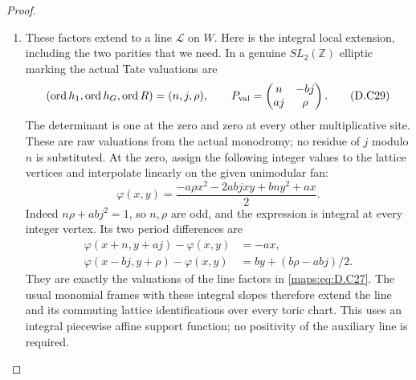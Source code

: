 \begin{proof}
\begin{enumerate}[label=\arabic*.,leftmargin=*]
\item These factors extend to a line $\mathcal L$ on $W$. Here is the
integral local extension, including the two parities that we need.
In a genuine $SL_2(\mathbb Z)$ elliptic marking the actual Tate
valuations are
\[
 (\operatorname{ord}h_1,\operatorname{ord}h_G,
       \operatorname{ord}R)=(n,j,\rho),\qquad
 P_{\rm val}=\begin{pmatrix}n&-bj\\aj&\rho\end{pmatrix}.
                                                               \tag{D.C29}\label{maps:eq:D.C29}
\]
The determinant is one at the zero and zero at every other
multiplicative site. These are raw valuations from the actual
monodromy; no residue of $j$ modulo $n$ is substituted.
At the zero, assign the following integer values to the lattice
vertices and interpolate linearly on the given unimodular fan:
\[
 \varphi(x,y)=
 \frac{-a\rho x^2-2abjxy+bn y^2+ax}{2}.                        \tag{D.C210}\label{maps:eq:D.C210}
\]
Indeed $n\rho+abj^2=1$, so $n,\rho$ are odd, and the expression is
integral at every integer vertex. Its two period differences are
\[
\begin{aligned}
 \varphi(x+n,y+aj)-\varphi(x,y)&=-ax,\\
 \varphi(x-bj,y+\rho)-\varphi(x,y)
          &=by+(b\rho-abj)/2.
\end{aligned}                                                   \tag{D.C211}\label{maps:eq:D.C211}
\]
They are exactly the valuations of the line factors in \eqref{maps:eq:D.C27}.
The usual monomial frames with these integral slopes therefore extend
the line and its commuting lattice identifications over every toric
chart. This uses an integral piecewise affine support function; no
positivity of the auxiliary line is required.


\end{enumerate}
\end{proof}
